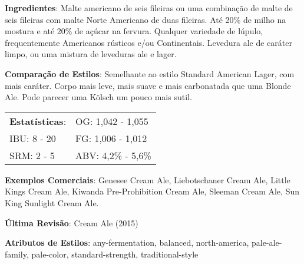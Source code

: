 \textbf{Ingredientes}: Malte americano de seis fileiras ou uma combinação de malte de seis fileiras com malte Norte Americano de duas fileiras. Até 20\% de milho na mostura e até 20\% de açúcar na fervura. Qualquer variedade de lúpulo, frequentemente Americanos rústicos e/ou Continentais. Levedura ale de caráter limpo, ou uma mistura de leveduras ale e lager.

\textbf{Comparação de Estilos}: Semelhante ao estilo Standard American Lager, com mais caráter. Corpo mais leve, mais suave e mais carbonatada que uma Blonde Ale. Pode parecer uma Kölsch um pouco mais sutil.

\begin{tabular}{@{}p{35mm}p{35mm}@{}}
  \textbf{Estatísticas}: & OG: 1,042 - 1,055 \\
  IBU: 8 - 20  & FG: 1,006 - 1,012 \\
  SRM: 2 - 5  & ABV: 4,2\% - 5,6\%
\end{tabular}

\textbf{Exemplos Comerciais}: Genesee Cream Ale, Liebotschaner Cream Ale, Little Kings Cream Ale, Kiwanda Pre-Prohibition Cream Ale, Sleeman Cream Ale, Sun King Sunlight Cream Ale.

\textbf{Última Revisão}: Cream Ale (2015)

\textbf{Atributos de Estilos}: any-fermentation, balanced, north-america, pale-ale-family, pale-color, standard-strength, traditional-style

